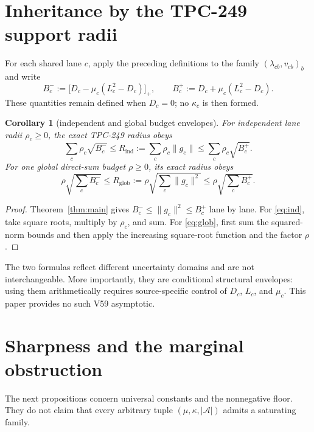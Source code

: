 \documentclass[11pt]{article}
\newtheorem{corollary}[theorem]{Corollary}
\theoremstyle{remark}
\newcommand{\A}{\mathcal A}
\newcommand{\Rind}{R_{\mathrm{ind}}}
\newcommand{\Rglob}{R_{\mathrm{glob}}}
\begin{document}
\section{Inheritance by the TPC-249 support radii}

For each shared lane $c$, apply the preceding definitions to the family
$(\lambda_{cb},v_{cb})_b$ and write
\begin{equation}\label{eq:Bpm}
 B_c^-:=\bigl[D_c-\mu_c(L_c^2-D_c)\bigr]_+,
 \qquad
 B_c^+:=D_c+\mu_c(L_c^2-D_c).
\end{equation}
These quantities remain defined when $D_c=0$; no $\kappa_c$ is then formed.

\begin{corollary}[independent and global budget envelopes]\label{cor:radii}
For independent lane radii $\rho_c\geq0$, the exact TPC-249 radius obeys
\begin{equation}\label{eq:ind}
 \sum_c\rho_c\sqrt{B_c^-}
 \leq \Rind:=\sum_c\rho_c\|g_c\|
 \leq\sum_c\rho_c\sqrt{B_c^+}.
\end{equation}
For one global direct-sum budget $\rho\geq0$, its exact radius obeys
\begin{equation}\label{eq:glob}
 \rho\sqrt{\sum_c B_c^-}
 \leq \Rglob:=\rho\sqrt{\sum_c\|g_c\|^2}
 \leq\rho\sqrt{\sum_c B_c^+}.
\end{equation}
\end{corollary}

\begin{proof}
Theorem~\ref{thm:main} gives $B_c^-\leq\|g_c\|^2\leq B_c^+$ lane by lane.
For \eqref{eq:ind}, take square roots, multiply by $\rho_c$, and sum.  For
\eqref{eq:glob}, first sum the squared-norm bounds and then apply the increasing
square-root function and the factor $\rho$.
\end{proof}

The two formulas reflect different uncertainty domains and are not
interchangeable.  More importantly, they are conditional structural
envelopes: using them arithmetically requires source-specific control of
$D_c$, $L_c$, and $\mu_c$.  This paper provides no such V59 asymptotic.

\section{Sharpness and the marginal obstruction}

The next propositions concern universal constants and the nonnegative floor.
They do not claim that every arbitrary tuple $(\mu,\kappa,|\A|)$ admits a
saturating family.
\end{document}
